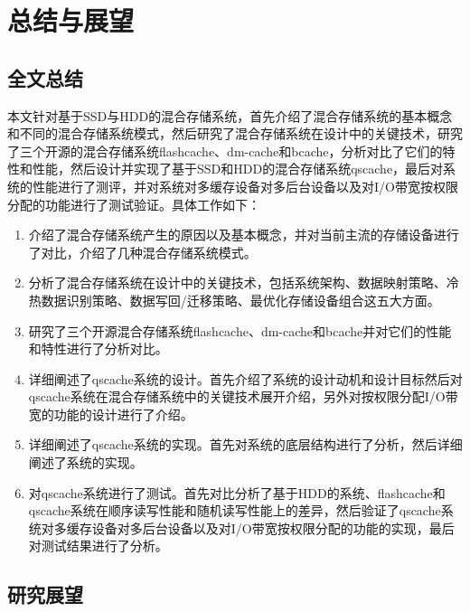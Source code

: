 

\chapter{总结与展望}
\label{chap:summary}

\section{全文总结}

本文针对基于SSD与HDD的混合存储系统，首先介绍了混合存储系统的基本概念和不同的混合存储系统模式，然后研究了混合存储系统在设计中的关键技术，研究了三个开源的混合存储系统flashcache、dm-cache和bcache，分析对比了它们的特性和性能，然后设计并实现了基于SSD和HDD的混合存储系统qscache，最后对系统的性能进行了测评，并对系统对多缓存设备对多后台设备以及对I/O带宽按权限分配的功能进行了测试验证。具体工作如下：

\begin{enumerate}[wide]
    \item 介绍了混合存储系统产生的原因以及基本概念，并对当前主流的存储设备进行了对比，介绍了几种混合存储系统模式。
    \item 分析了混合存储系统在设计中的关键技术，包括系统架构、数据映射策略、冷热数据识别策略、数据写回/迁移策略、最优化存储设备组合这五大方面。
    \item 研究了三个开源混合存储系统flashcache、dm-cache和bcache并对它们的性能和特性进行了分析对比。
    \item 详细阐述了qscache系统的设计。首先介绍了系统的设计动机和设计目标然后对qscache系统在混合存储系统中的关键技术展开介绍，另外对按权限分配I/O带宽的功能的设计进行了介绍。
    \item 详细阐述了qscache系统的实现。首先对系统的底层结构进行了分析，然后详细阐述了系统的实现。
    \item 对qscache系统进行了测试。首先对比分析了基于HDD的系统、flashcache和qscache系统在顺序读写性能和随机读写性能上的差异，然后验证了qscache系统对多缓存设备对多后台设备以及对I/O带宽按权限分配的功能的实现，最后对测试结果进行了分析。
\end{enumerate}

\section{研究展望}

